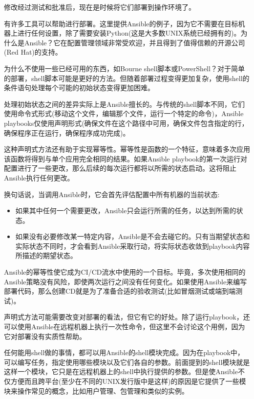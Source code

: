 
修改经过测试和批准后，现在是时候将它们部署到操作环境了。

有许多工具可以帮助进行部署。这里提供Ansible的例子，因为它不需要在目标机器上进行任何设置，除了需要安装Python(这是大多数UNIX系统已经拥有的)。为什么是Ansible？它在配置管理领域非常受欢迎，并且得到了值得信赖的开源公司(Red Hat)的支持。


为什么不使用一些已经可用的东西，如Bourne shell脚本或PowerShell？对于简单的部署，shell脚本可能是更好的方法。但随着部署过程变得更加复杂，使用shell的条件语句处理每个可能的初始状态变得更加困难。

处理初始状态之间的差异实际上是Ansible擅长的。与传统的shell脚本不同，它们使用命令式形式(移动这个文件，编辑那个文件，运行一个特定的命令)，Ansible playbooks仅使用声明形式(确保文件在这个路径中可用，确保文件包含指定的行，确保程序正在运行，确保程序成功完成)。

这种声明式方法还有助于实现幂等性。幂等性是函数的一个特征，意味着多次应用该函数将得到与单个应用完全相同的结果。如果Ansible playbook的第一次运行对配置进行了一些更改，那么后续的每次运行都将以所需的状态启动。这将阻止Ansible执行任何更改。

换句话说，当调用Ansible时，它会首先评估配置中所有机器的当前状态:

\begin{itemize}
\item 
如果其中任何一个需要更改，Ansible只会运行所需的任务，以达到所需的状态。

\item 
如果没有必要修改某一特定内容，Ansible是不会去碰它的。只有当期望状态和实际状态不同时，才会看到Ansible采取行动，将实际状态收敛到playbook内容所描述的期望状态。
\end{itemize}


Ansible的幂等性使它成为CI/CD流水中使用的一个目标。毕竟，多次使用相同的Ansible策略没有风险，即使两次运行之间没有任何变化。如果使用Ansible来编写部署代码，那么创建CD就是为了准备合适的验收测试(比如冒烟测试或端到端测试)。

声明式方法可能需要改变对部署的看法，但它有它的好处。除了运行playbook，还可以使用Ansible在远程机器上执行一次性命令，但这里不会讨论这个用例，因为它对部署没有实质性帮助。

任何能用shell做的事情，都可以用Ansible的shell模块完成。因为在playbook中，可以编写任务，指定使用哪些模块以及它们各自的参数。前面提到的shell模块就是这样一个模块，它只是在远程机器上的shell中执行提供的参数。但是使Ansible不仅方便而且跨平台(至少在不同的UNIX发行版中是这样)的原因是它提供了一些模块来操作常见的概念，比如用户管理、包管理和类似的实例。

